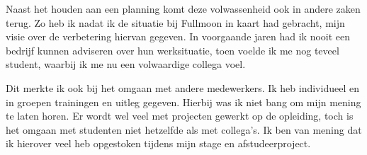 Naast het houden aan een planning komt deze volwassenheid ook in andere zaken terug. Zo heb ik nadat ik de situatie bij Fullmoon in kaart had gebracht, mijn visie over de verbetering hiervan gegeven. In voorgaande jaren had ik nooit een bedrijf kunnen adviseren over hun werksituatie, toen voelde ik me nog teveel student, waarbij ik me nu een volwaardige collega voel. 

Dit merkte ik ook bij het omgaan met andere medewerkers. Ik heb individueel en in groepen trainingen en uitleg gegeven. Hierbij was ik niet bang om mijn mening te laten horen. Er wordt wel veel met projecten gewerkt op de opleiding, toch is het omgaan met studenten niet hetzelfde als met collega's. Ik ben van mening dat ik hierover veel heb opgestoken tijdens mijn stage en afstudeerproject.
